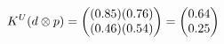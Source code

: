 \documentclass[preview]{standalone}
\begin{document}
\begin{align*}
\special{dvisvgm:raw <g id='unique000'>}K^U(d \otimes p) = \begin{pmatrix} (0.85)(0.76) \\ (0.46)(0.54) \end{pmatrix} = \begin{pmatrix} 0.64 \\ 0.25 \end{pmatrix}\special{dvisvgm:raw </g>}
\end{align*}
\end{document}
